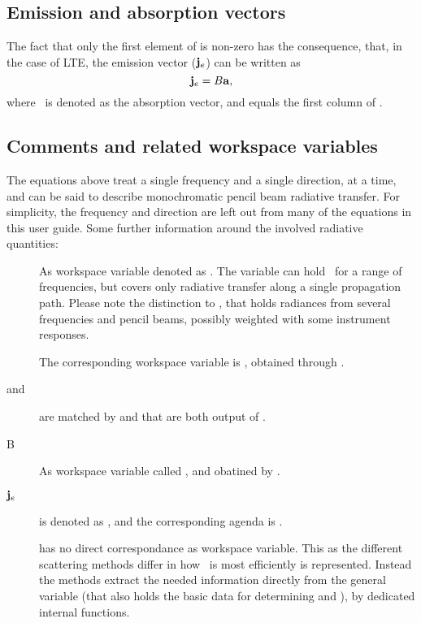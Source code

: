 \subsection{Emission and absorption vectors}
\label{sec:rteq:evec}

The fact that only the first element of  is non-zero has the
consequence, that, in the case of LTE, the emission vector ($\mathbf{j}_e$) can
be written as
\begin{equation}
  \label{eq:evec}
  \mathbf{j}_e = B {\bf a},
\end{equation}
where \AbsVec\ is denoted as the absorption vector, and equals the first column
of \AbsMat.


\subsection{Comments and related workspace variables}
\label{sec:rteq:wsv}
%
The equations above treat a single frequency and a single direction, at a
time, and can be said to describe monochromatic pencil beam radiative
transfer. For simplicity, the frequency and direction are left out from many of
the equations in this user guide. 
Some further information around the involved radiative quantities:
\begin{description}
\item[\StoVec] As workspace variable denoted as . The variable can
  hold \StoVec\ for a range of frequencies, but covers only radiative transfer
  along a single propagation path. Please note the distinction to ,
  that holds radiances from several frequencies and pencil beams, possibly
  weighted with some instrument responses.
\item[] The corresponding workspace variable is
  , obtained through
  .
\item[ and ] are matched by 
  and  that are both output of
  .
\item[B] As workspace variable called , and 
  obatined by .
\item[$\mathbf{j}_e$] is denoted as , and the
  corresponding agenda is .
\item[\PhaMat] has no direct correspondance as workspace variable. This as the
  different scattering methods differ in how \PhaMat\ is most efficiently is
  represented. Instead the methods extract the needed information directly from
  the general variable  (that also holds the basic
  data for determining  and ), by dedicated internal
  functions.
\end{description}
